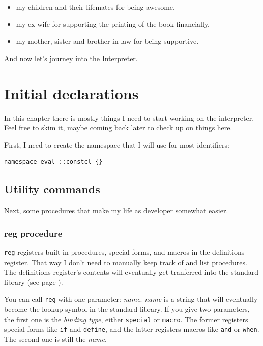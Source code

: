 \documentclass[twoside]{report}
\begin{document}
\begin{itemize}
\item my children and their lifemates for being awesome.

\item my ex-wife for supporting the printing of the book financially.

\item my mother, sister and brother-in-law for being supportive.
\end{itemize}

And now let's journey into the Interpreter.

\chapter{Initial declarations}
\label{initial-declarations}

In this chapter there is mostly things I need to start working on the interpreter. Feel free to skim it, maybe coming back later to check up on things here.

First, I need to create the namespace that I will use for most identifiers:

\begin{lstlisting}
namespace eval ::constcl {}
\end{lstlisting}

\section{Utility commands}
\label{utility-commands}

Next, some procedures that make my life as developer somewhat easier.

\subsection{reg procedure}
\label{reg-procedure}

\texttt{reg} registers built-in procedures, special forms, and macros in the definitions register. That way I don't need to manually keep track of and list procedures. The definitions register's contents will eventually get tranferred into the standard library (see page \pageref{environment-startup}).

You can call \texttt{reg} with one parameter: \emph{name}. \emph{name} is a string that will eventually become the lookup symbol in the standard library. If you give two parameters, the first one is the \emph{binding type}, either \texttt{special} or \texttt{macro}. The former registers special forms like \texttt{if} and \texttt{define}, and the latter registers macros like \texttt{and} or \texttt{when}. The second one is still the \emph{name}.
\end{document}
